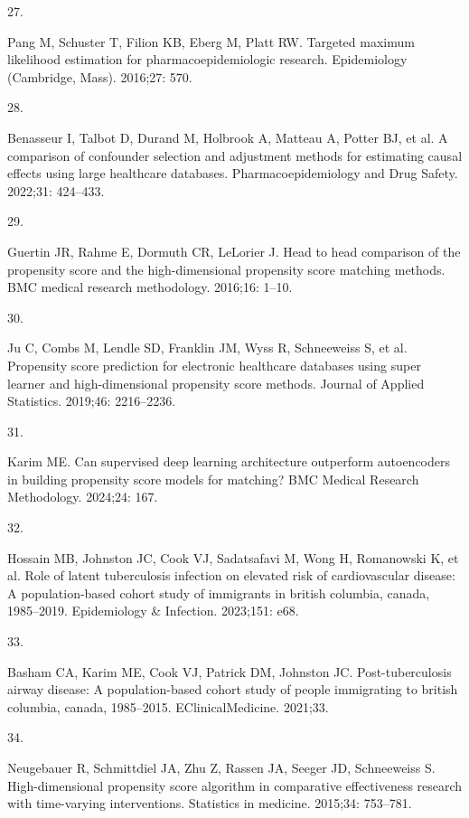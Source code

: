 \documentclass[10pt,letterpaper]{article}
\newlength{\cslhangindent}
\newlength{\csllabelwidth}
\newenvironment{CSLReferences}[2] %
 {\begin{list}{}{%
  \setlength{\itemindent}{0pt}
  \setlength{\leftmargin}{0pt}
  \setlength{\parsep}{0pt}
  \ifodd #1
   \setlength{\leftmargin}{\cslhangindent}
   \setlength{\itemindent}{-1\cslhangindent}
  \fi
  \setlength{\itemsep}{#2\baselineskip}}}
 {\end{list}}
\newcommand{\CSLLeftMargin}[1]{\parbox[t]{\csllabelwidth}{#1}}
\newcommand{\CSLRightInline}[1]{\parbox[t]{\linewidth - \csllabelwidth}{#1}\break}
\begin{document}
\begin{CSLReferences}{0}{1}
\CSLLeftMargin{27. }%
\CSLRightInline{Pang M, Schuster T, Filion KB, Eberg M, Platt RW.
Targeted maximum likelihood estimation for pharmacoepidemiologic
research. Epidemiology (Cambridge, Mass). 2016;27: 570. }

\CSLLeftMargin{28. }%
\CSLRightInline{Benasseur I, Talbot D, Durand M, Holbrook A, Matteau A,
Potter BJ, et al. A comparison of confounder selection and adjustment
methods for estimating causal effects using large healthcare databases.
Pharmacoepidemiology and Drug Safety. 2022;31: 424--433. }

\CSLLeftMargin{29. }%
\CSLRightInline{Guertin JR, Rahme E, Dormuth CR, LeLorier J. Head to
head comparison of the propensity score and the high-dimensional
propensity score matching methods. BMC medical research methodology.
2016;16: 1--10. }

\CSLLeftMargin{30. }%
\CSLRightInline{Ju C, Combs M, Lendle SD, Franklin JM, Wyss R,
Schneeweiss S, et al. Propensity score prediction for electronic
healthcare databases using super learner and high-dimensional propensity
score methods. Journal of Applied Statistics. 2019;46: 2216--2236. }

\CSLLeftMargin{31. }%
\CSLRightInline{Karim ME. Can supervised deep learning architecture
outperform autoencoders in building propensity score models for
matching? BMC Medical Research Methodology. 2024;24: 167. }

\CSLLeftMargin{32. }%
\CSLRightInline{Hossain MB, Johnston JC, Cook VJ, Sadatsafavi M, Wong H,
Romanowski K, et al. Role of latent tuberculosis infection on elevated
risk of cardiovascular disease: A population-based cohort study of
immigrants in british columbia, canada, 1985--2019. Epidemiology \&
Infection. 2023;151: e68. }

\CSLLeftMargin{33. }%
\CSLRightInline{Basham CA, Karim ME, Cook VJ, Patrick DM, Johnston JC.
Post-tuberculosis airway disease: A population-based cohort study of
people immigrating to british columbia, canada, 1985--2015.
EClinicalMedicine. 2021;33. }

\CSLLeftMargin{34. }%
\CSLRightInline{Neugebauer R, Schmittdiel JA, Zhu Z, Rassen JA, Seeger
JD, Schneeweiss S. High-dimensional propensity score algorithm in
comparative effectiveness research with time-varying interventions.
Statistics in medicine. 2015;34: 753--781. }

\end{CSLReferences}
\end{document}
